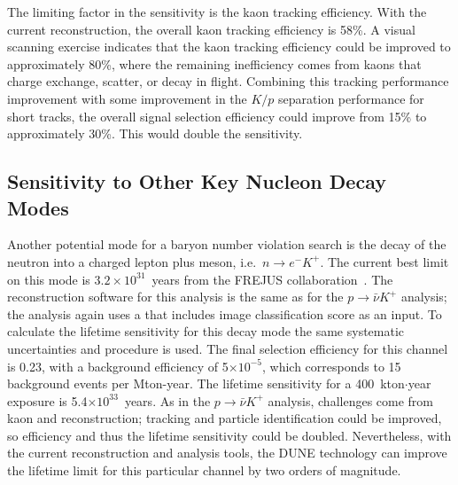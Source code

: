The limiting factor in the sensitivity is the kaon tracking efficiency.  With the current reconstruction, 
the overall kaon tracking efficiency is 58\%.
A visual scanning exercise indicates that the kaon tracking efficiency could be improved to approximately 80\%, where the remaining inefficiency comes from kaons that charge exchange, scatter, or decay in flight.
Combining this tracking performance improvement with some improvement in the $K/p$ separation performance for short tracks, the overall signal selection efficiency could improve from 15\% to approximately 30\%.  This would double the sensitivity.  

\subsection{Sensitivity to Other Key Nucleon Decay Modes}
\label{subsec:nonaccel-ndk-other}

Another potential mode for a baryon number violation search is the decay of the neutron into a charged lepton plus meson, i.e.~$n\rightarrow e^{-}K^{+}$. The current best limit on this mode is $3.2\times 10^{31}$~years from the FREJUS collaboration~\cite{Berger:1991fa}. The reconstruction software for this analysis is the same as for the $p\rightarrow \bar{\nu} K^{+} $ analysis; the analysis again uses a  that includes image classification score as an input. To calculate the lifetime sensitivity for this decay mode the same systematic uncertainties and procedure is used. The final selection efficiency for this channel is 0.23, with a background efficiency of 5$\times 10^{-5}$, which corresponds to 15 background events per Mton-year. The lifetime sensitivity for a 400~kton$\cdot$year exposure is 5.4$\times 10^{33}$~years. As in the $p\rightarrow \bar{\nu}K^{+}$ analysis, challenges come from kaon  and reconstruction; tracking and particle identification could be improved, so efficiency and thus the lifetime sensitivity could be doubled.  Nevertheless, with the current reconstruction and analysis tools, the DUNE  technology can improve the lifetime limit for this particular channel by two orders of magnitude.

